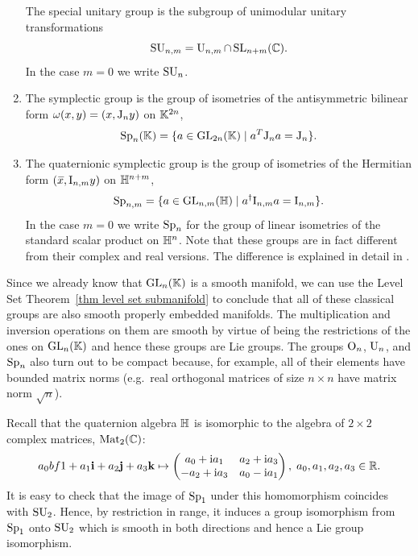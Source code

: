 \begin{example}
\begin{enumerate}
        The special unitary group is the subgroup of unimodular unitary transformations
        \[\operatorname{SU}_{n,m}=\operatorname{U}_{n,m}\cap \operatorname{SL}_{n+m}(\mathbb{C}).\]
        In the case $m=0$ we write $\operatorname{SU}_n$.
        \item The symplectic group is the group of isometries of the antisymmetric bilinear form $\omega(x,y)=(x,\mathrm{J}_n y)$ on $\mathbb{K}^{2n}$,
        \[\operatorname{Sp}_n(\mathbb{K})=\{a\in\operatorname{GL}_{2n}(\mathbb{K})\mid a^T \mathrm{J}_n a=\mathrm{J}_n\}.\]
        \item The quaternionic symplectic group is the group of isometries of the Hermitian form $(\wb{x},\rmI_{n,m}y)$ on $\mathbb{H}^{n+m}$,
        \[\operatorname{Sp}_{n,m}=\{a\in\operatorname{GL}_{n,m}(\mathbb{H})\mid a^\dagger \mathrm{I}_{n,m}a=\mathrm{I}_{n,m}\}.\]
        In the case $m=0$ we write $\operatorname{Sp}_n$ for the group of linear isometries of the standard scalar product on $\mathbb{H}^n$. Note that these groups are in fact different from their complex and real versions. The difference is explained in detail in \cite[pp.~5-6]{Sepanski}.
    \end{enumerate}
\end{example}

Since we already know that $\operatorname{GL}_n(\mathbb{K})$ is a smooth manifold, we can use the Level Set Theorem~\ref{thm level set submanifold} to conclude that all of these classical groups are also smooth properly embedded manifolds. The multiplication and inversion operations on them are smooth by virtue of being the restrictions of the ones on $\operatorname{GL}_n(\mathbb{K})$ and hence these groups are Lie groups. The groups $\operatorname{O}_n$, $\operatorname{U}_n$, and $\operatorname{Sp}_n$ also turn out to be compact because, for example, all of their elements have bounded matrix norms (e.g.~real orthogonal matrices of size $n\times n$ have matrix norm $\sqrt{n}$).


\begin{example}[$\SU_2\cong \Sp_1$]
    Recall that the quaternion algebra $\mathbb{H}$ is isomorphic to the algebra of $2\times 2$ complex matrices, $\operatorname{Mat}_2(\mathbb{C})$:
    \[a_0 bf{1}+a_1 \mathbf{i}+a_2 \mathbf{j}+a_3 \mathbf{k}\mapsto
    \begin{pmatrix}
        a_0+\mathrm{i} a_1&a_2+\mathrm{i} a_3\\
        -a_2+\mathrm{i} a_3&a_0-\mathrm{i} a_1
    \end{pmatrix}, \; a_0,a_1,a_2,a_3\in\mathbb{R}.\label{46939}
    \]
    It is easy to check that the image of $\operatorname{Sp}_1$ under this homomorphism coincides with $\operatorname{SU}_2$. Hence, by restriction in range, it induces a group isomorphism from $\operatorname{Sp}_1$ onto $\operatorname{SU}_2$ which is smooth in both directions and hence a Lie group isomorphism.
\end{example}

